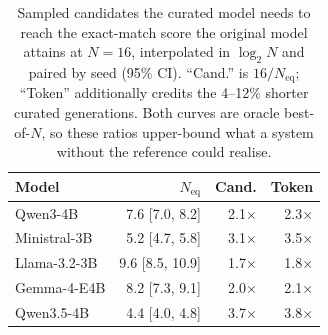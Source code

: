 \begin{table}[t]
\centering
\small
\begin{tabular}{lrrr}
\toprule
Model & $N_{\text{eq}}$ & Cand. & Token \\
\midrule
Qwen3-4B & 7.6 [7.0, 8.2] & 2.1$\times$ & 2.3$\times$ \\
Ministral-3B & 5.2 [4.7, 5.8] & 3.1$\times$ & 3.5$\times$ \\
Llama-3.2-3B & 9.6 [8.5, 10.9] & 1.7$\times$ & 1.8$\times$ \\
Gemma-4-E4B & 8.2 [7.3, 9.1] & 2.0$\times$ & 2.1$\times$ \\
Qwen3.5-4B & 4.4 [4.0, 4.8] & 3.7$\times$ & 3.8$\times$ \\
\bottomrule
\end{tabular}
\caption{Sampled candidates the curated model needs to reach the exact-match score the original model attains at $N=16$, interpolated in $\log_2 N$ and paired by seed (95\% CI). ``Cand.'' is $16/N_{\text{eq}}$; ``Token'' additionally credits the 4--12\% shorter curated generations. Both curves are oracle best-of-$N$, so these ratios upper-bound what a system without the reference could realise.}
\label{tab:budget}
\end{table}

